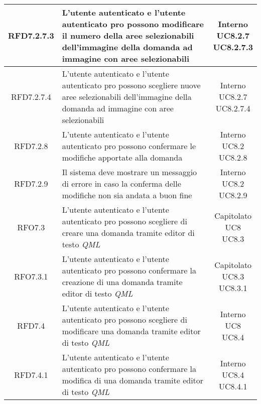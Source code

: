 \begin{longtable}{|c|>{\centering}m{7cm}|c|}
			 \hypertarget{{RFD7.2.7.3}}{{RFD7.2.7.3}} & L’utente autenticato e l’utente
autenticato pro possono modificare il
numero della aree selezionabili
dell’immagine della domanda ad
immagine con aree selezionabili & \makecell{Interno\\ UC8.2.7 \\UC8.2.7.3 } \\ \hline
			 \hypertarget{{RFD7.2.7.4}}{{RFD7.2.7.4}} & L’utente autenticato e l’utente
autenticato pro possono scegliere nuove
aree selezionabili dell’immagine della
domanda ad immagine con aree
selezionabili & \makecell{Interno\\ UC8.2.7 \\UC8.2.7.4 } \\ \hline
			 \hypertarget{{RFD7.2.8}}{{RFD7.2.8}} & L’utente autenticato e l’utente
autenticato pro possono confermare le
modifiche apportate alla domanda & \makecell{Interno\\ UC8.2 \\UC8.2.8 } \\ \hline
			 \hypertarget{{RFD7.2.9}}{{RFD7.2.9}} & Il sistema deve mostrare un messaggio di
errore in caso la conferma delle modifiche
non sia andata a buon fine & \makecell{Interno\\ UC8.2 \\UC8.2.9 } \\ \hline
			 \hypertarget{{RFO7.3}}{{RFO7.3}} & L’utente autenticato e l’utente autenticato pro possono scegliere di creare una domanda tramite editor di testo \textit{QML\ped{G}} & \makecell{Capitolato\\ UC8 \\UC8.3 } \\ \hline
			 \hypertarget{{RFO7.3.1}}{{RFO7.3.1}} & L’utente autenticato e l’utente autenticato pro possono confermare la creazione di una domanda tramite editor di testo \textit{QML\ped{G}} & \makecell{Capitolato\\ UC8.3 \\UC8.3.1 } \\ \hline
			 \hypertarget{{RFD7.4}}{{RFD7.4}} & L’utente autenticato e l’utente autenticato pro possono scegliere di modificare una domanda tramite editor di testo \textit{QML\ped{G}} & \makecell{Interno\\ UC8 \\UC8.4 } \\ \hline
			 \hypertarget{{RFD7.4.1}}{{RFD7.4.1}} & L’utente autenticato e l’utente autenticato pro possono confermare la modifica di una domanda tramite editor di testo \textit{QML\ped{G}} & \makecell{Interno\\ UC8.4 \\UC8.4.1 } \\ \hline

\end{longtable}
